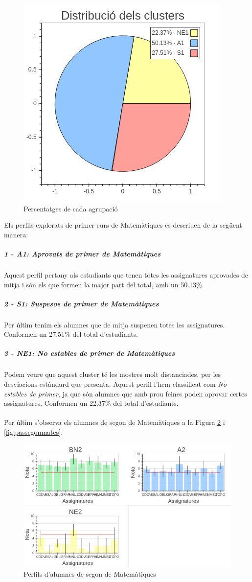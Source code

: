 \documentclass[12pt,a4paper,catalan]{article}
\begin{document}
\begin{figure}[h]
\centering
\includegraphics[width=.4\linewidth]{img/perfils_primer_mates_pastilla.png}
\caption{Percentatges de cada agrupació}
\label{fig:pasprimermates}
\end{figure}

\newpage

Els perfils explorats de primer curs de Matemàtiques es descriuen de la següent manera:

\subparagraph{1 - A1: Aprovats de primer de Matemàtiques}
Aquest perfil pertany als estudiants que tenen totes les assignatures aprovades  de mitja i són els que formen la major part del total, amb un 50.13\%.

\subparagraph{2 - S1: Suspesos de primer de Matemàtiques}
Per últim tenim els alumnes que de mitja suspenen totes les assignatures. Conformen un 27.51\% del total d'estudiants.

\subparagraph{3 - NE1: No estables de primer de Matemàtiques}
Podem veure que aquest cluster té les mostres molt distanciades, per les desviacions estàndard que presenta. Aquest perfil l'hem classificat com \textit{No estables de primer}, ja que són alumnes que amb prou feines poden aprovar certes assignatures. Conformen un 22.37\% del total d'estudiants.
\\
\\
Per últim s'observa els alumnes de segon de Matemàtiques a la Figura \ref{fig:perfilssegonmates} i \ref{fig:passegonmates}.

\begin{figure}[h]
\centering
\includegraphics[width=.85\linewidth]{img/perfils_segon_mates.png}
\caption{Perfils d'alumnes de segon de Matemàtiques}
\label{fig:perfilssegonmates}
\end{figure}
\end{document}

